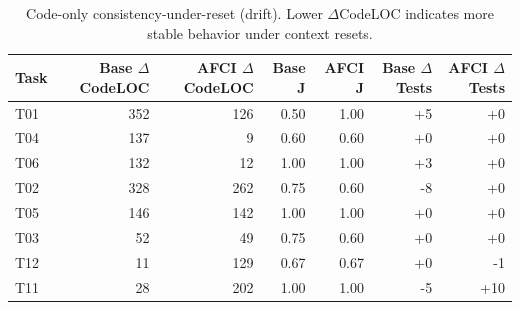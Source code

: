 \begin{table}[t]
\centering
\caption{Code-only consistency-under-reset (drift). Lower $\Delta$CodeLOC indicates more stable behavior under context resets.}
\vspace{-2.5ex}
\label{tab:drift_codeonly}
\footnotesize
\setlength{\tabcolsep}{5pt}
\renewcommand{\arraystretch}{1.05}
\begin{tabular*}{\textwidth}{@{\extracolsep{\fill}}lrrrrrr@{}}
\toprule
Task & Base $\Delta$CodeLOC & AFCI $\Delta$CodeLOC & Base J & AFCI J & Base $\Delta$Tests & AFCI $\Delta$Tests \\
\midrule
T01 & 352 & 126 & 0.50 & 1.00 & +5 & +0 \\
T04 & 137 & 9   & 0.60 & 0.60 & +0 & +0 \\
T06 & 132 & 12  & 1.00 & 1.00 & +3 & +0 \\
T02 & 328 & 262 & 0.75 & 0.60 & -8 & +0 \\
T05 & 146 & 142 & 1.00 & 1.00 & +0 & +0 \\
T03 & 52  & 49  & 0.75 & 0.60 & +0 & +0 \\
T12 & 11  & 129 & 0.67 & 0.67 & +0 & -1 \\
T11 & 28  & 202 & 1.00 & 1.00 & -5 & +10 \\
\bottomrule
\end{tabular*}
\end{table}